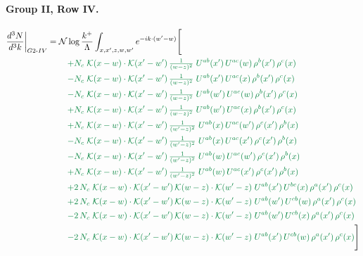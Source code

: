 \documentclass[10pt]{article}
\numberwithin{equation}{section}
\newcommand{\NN}{\mathcal N\log\frac{k^+}{\Lambda}}
\begin{document}
\paragraph{Group II, Row IV.}
\begin{align}
\frac{d^3N}{d^3k}\bigg|_{G2\text{-}IV}={}&\NN\int_{x,x',z,w,w'}e^{-ik\cdot(w'-w)}\Bigg[\notag\\
&\quad{\color{JIM}+N_c\;\mathcal{K}(x-w)\cdot\mathcal{K}(x'-w')\,\tfrac{1}{(w-z)^{2}}\;U^{ab}(x')\,U^{ac}(w)\,\rho^{b}(x')\,\rho^{c}(x)}\notag\\
&\quad{\color{JIM}-N_c\;\mathcal{K}(x-w)\cdot\mathcal{K}(x'-w')\,\tfrac{1}{(w-z)^{2}}\;U^{ab}(x')\,U^{ac}(x)\,\rho^{b}(x')\,\rho^{c}(x)}\notag\\
&\quad{\color{JIM}-N_c\;\mathcal{K}(x-w)\cdot\mathcal{K}(x'-w')\,\tfrac{1}{(w-z)^{2}}\;U^{ab}(w')\,U^{ac}(w)\,\rho^{b}(x')\,\rho^{c}(x)}\notag\\
&\quad{\color{JIM}+N_c\;\mathcal{K}(x-w)\cdot\mathcal{K}(x'-w')\,\tfrac{1}{(w-z)^{2}}\;U^{ab}(w')\,U^{ac}(x)\,\rho^{b}(x')\,\rho^{c}(x)}\notag\\
&\quad{\color{JIM}+N_c\;\mathcal{K}(x-w)\cdot\mathcal{K}(x'-w')\,\tfrac{1}{(w'-z)^{2}}\;U^{ab}(x)\,U^{ac}(w')\,\rho^{c}(x')\,\rho^{b}(x)}\notag\\
&\quad{\color{JIM}-N_c\;\mathcal{K}(x-w)\cdot\mathcal{K}(x'-w')\,\tfrac{1}{(w'-z)^{2}}\;U^{ab}(x)\,U^{ac}(x')\,\rho^{c}(x')\,\rho^{b}(x)}\notag\\
&\quad{\color{JIM}-N_c\;\mathcal{K}(x-w)\cdot\mathcal{K}(x'-w')\,\tfrac{1}{(w'-z)^{2}}\;U^{ab}(w)\,U^{ac}(w')\,\rho^{c}(x')\,\rho^{b}(x)}\notag\\
&\quad{\color{JIM}+N_c\;\mathcal{K}(x-w)\cdot\mathcal{K}(x'-w')\,\tfrac{1}{(w'-z)^{2}}\;U^{ab}(w)\,U^{ac}(x')\,\rho^{c}(x')\,\rho^{b}(x)}\notag\\
&\quad{\color{JIM}+2\,N_c\;\mathcal{K}(x-w)\cdot\mathcal{K}(x'-w')\,\mathcal{K}(w-z)\cdot\mathcal{K}(w'-z)\;U^{ab}(x')\,U^{bc}(x)\,\rho^{a}(x')\,\rho^{c}(x)}\notag\\
&\quad{\color{JIM}+2\,N_c\;\mathcal{K}(x-w)\cdot\mathcal{K}(x'-w')\,\mathcal{K}(w-z)\cdot\mathcal{K}(w'-z)\;U^{ab}(w')\,U^{cb}(w)\,\rho^{a}(x')\,\rho^{c}(x)}\notag\\
&\quad{\color{JIM}-2\,N_c\;\mathcal{K}(x-w)\cdot\mathcal{K}(x'-w')\,\mathcal{K}(w-z)\cdot\mathcal{K}(w'-z)\;U^{ab}(w')\,U^{cb}(x)\,\rho^{a}(x')\,\rho^{c}(x)}\notag\\
&\quad{\color{JIM}-2\,N_c\;\mathcal{K}(x-w)\cdot\mathcal{K}(x'-w')\,\mathcal{K}(w-z)\cdot\mathcal{K}(w'-z)\;U^{ab}(x')\,U^{cb}(w)\,\rho^{a}(x')\,\rho^{c}(x)}\Bigg]\label{eq:gen6}
\end{align}
\end{document}

